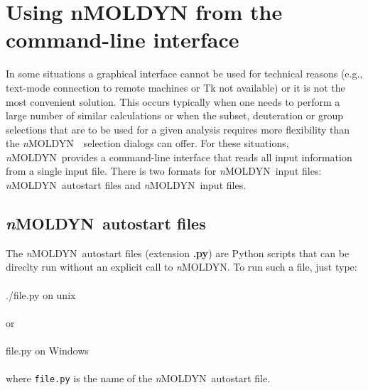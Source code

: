 \documentclass[a4paper,11pt]{report}
\newcommand{\NMOLDYN}{\textit{n}MOLDYN}
\begin{document}
\chapter{Using nMOLDYN from the command-line interface}
\label{running_nmoldyn_from_the_command_line_interface}
In some situations a graphical interface cannot be used for technical reasons (e.g., text-mode connection to remote 
machines or Tk not available) or it is not the most convenient solution. This occurs typically when one needs to perform a 
large number of similar calculations or when the subset, deuteration or group selections that are to be used for a given 
analysis requires more flexibility than the \NMOLDYN\ \GUI\ selection dialogs can offer. For these situations, \NMOLDYN\ provides a command-line interface 
that reads all input information from a single input file. There is two formats for \NMOLDYN\ input files: \NMOLDYN\ 
autostart files and \NMOLDYN\ input files.

\section{\NMOLDYN\ autostart files}
\label{nmoldyn_autostart_files}
The \NMOLDYN\ autostart files (extension \textbf{.py}) are Python scripts that can be direclty run without an explicit call to \NMOLDYN . To run such a file, 
just type:
\\
\\
{\ttfamily ./file.py} on unix
\\\\
or
\\\\
{\ttfamily file.py} on Windows
\\
\\
where \texttt{file.py} is the name of the \NMOLDYN\ autostart file.
\end{document}
